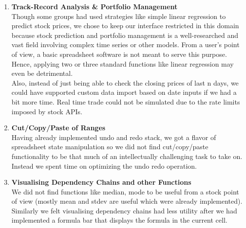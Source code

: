 \documentclass[12pt]{article}
\begin{document}
    \begin{enumerate}[leftmargin=1.5em]

        \item \textbf{Track-Record Analysis \& Portfolio Management}  \\
        Though some groups had used strategies like simple linear regression to predict stock prices, we chose to keep our interface restricted in this domain because stock prediction and portfolio management is a well-researched and vast field involving complex time series or other models. From a user's point of view, a basic spreadsheet software is not meant to serve this purpose. Hence, applying two or three standard functions like linear regression may even be detrimental.\\
        Also, instead of just being able to check the closing prices of last n days, we could have supported custom data import based on date inputs if we had a bit more time. Real time trade could not be simulated due to the rate limits imposed by stock APIs.

        \item \textbf{Cut/Copy/Paste of Ranges}  \\
        Having already implemented undo and redo stack, we got a flavor of spreadsheet state manipulation so we did not find cut/copy/paste functionality to be that much of an intellectually challenging task to take on. Instead we spent time on optimizing the undo redo operation.

        \item \textbf{Visualising Dependency Chains and other Functions}  \\
        We did not find functions like median, mode to be useful from a stock point of view (mostly mean and stdev are useful which were already implemented). Similarly we felt visualising dependency chains had less utility after we had implemented a formula bar that displays the formula in the current cell.
    \end{enumerate}
\end{document}
